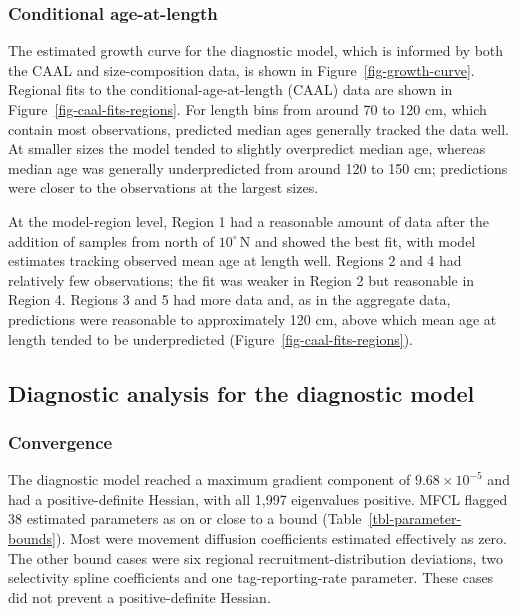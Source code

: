 \documentclass[
  english,
  a4paper,
  a4paper,
  11pt]{SCreport}
\begin{document}
\subsubsection{Conditional age-at-length}\label{sec-fit-CAAL}

The estimated growth curve for the diagnostic model, which is informed
by both the CAAL and size-composition data, is shown in
Figure~\ref{fig-growth-curve}. Regional fits to the
conditional-age-at-length (CAAL) data are shown in
Figure~\ref{fig-caal-fits-regions}. For length bins from around 70 to
120 cm, which contain most observations, predicted median ages generally
tracked the data well. At smaller sizes the model tended to slightly
overpredict median age, whereas median age was generally underpredicted
from around 120 to 150 cm; predictions were closer to the observations
at the largest sizes.

At the model-region level, Region 1 had a reasonable amount of data
after the addition of samples from north of \(10^{\circ}\,\mathrm{N}\)
and showed the best fit, with model estimates tracking observed mean age
at length well. Regions 2 and 4 had relatively few observations; the fit
was weaker in Region 2 but reasonable in Region 4. Regions 3 and 5 had
more data and, as in the aggregate data, predictions were reasonable to
approximately 120 cm, above which mean age at length tended to be
underpredicted (Figure~\ref{fig-caal-fits-regions}).

\subsection{Diagnostic analysis for the diagnostic
model}\label{sec-diagnostics}

\subsubsection{Convergence}\label{sec-diag-convergence}

The diagnostic model reached a maximum gradient component of
\(9.68 \times 10^{-5}\) and had a positive-definite Hessian, with all
1,997 eigenvalues positive. MFCL flagged 38 estimated parameters as on
or close to a bound (Table~\ref{tbl-parameter-bounds}). Most were
movement diffusion coefficients estimated effectively as zero. The other
bound cases were six regional recruitment-distribution deviations, two
selectivity spline coefficients and one tag-reporting-rate parameter.
These cases did not prevent a positive-definite Hessian.
\end{document}
